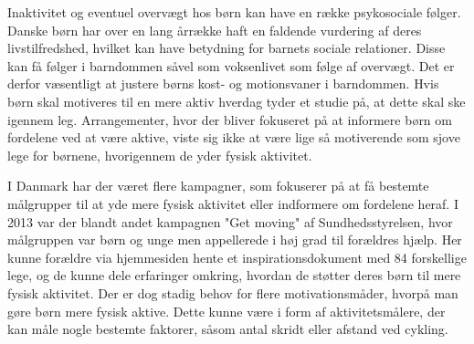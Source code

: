 
Inaktivitet og eventuel overvægt hos børn kan have en række psykosociale følger. Danske børn har over en lang årrække haft en faldende vurdering af deres livstilfredshed, hvilket kan have betydning for barnets sociale relationer. Disse kan få følger i barndommen såvel som voksenlivet som følge af overvægt. Det er derfor væsentligt at justere børns kost- og motionsvaner i barndommen. \citep{Universitet2014,StatensInstitutforFolkesundhed2007} Hvis børn skal motiveres til en mere aktiv hverdag tyder et studie på, at dette skal ske igennem leg. Arrangementer, hvor der bliver fokuseret på at informere børn om fordelene ved at være aktive, viste sig ikke at være lige så motiverende som sjove lege for børnene, hvorigennem de yder fysisk aktivitet. %
\citep{J.Sebire2013}

I Danmark har der været flere kampagner, som fokuserer på at få bestemte målgrupper til at yde mere fysisk aktivitet eller indformere om fordelene heraf. I 2013 var der blandt andet kampagnen "Get moving" af Sundhedsstyrelsen, hvor målgruppen var børn og unge men appellerede i høj grad til forældres hjælp. Her kunne forældre via hjemmesiden hente et inspirationsdokument med 84 forskellige lege, og de kunne dele erfaringer omkring, hvordan de støtter deres børn til mere fysisk aktivitet.  \citep{Sundhedsstyrelsen2013} Der er dog stadig behov for flere motivationsmåder, hvorpå man gøre børn mere fysisk aktive. Dette kunne være i form af aktivitetsmålere, der kan måle nogle bestemte faktorer, såsom antal skridt eller afstand ved cykling.  
  \newpage

